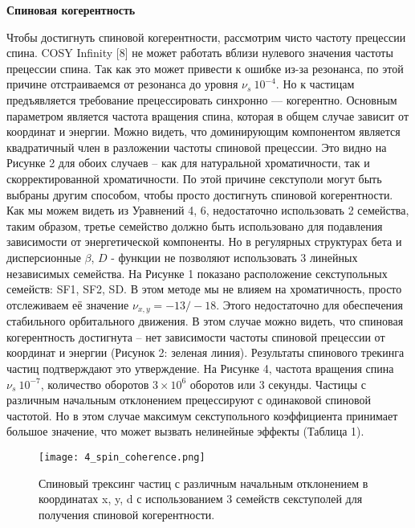 \textbf{Спиновая когерентность}
\par Чтобы достигнуть спиновой когерентности, рассмотрим чисто частоту прецессии спина. COSY Infinity [8] не может работать вблизи нулевого значения частоты прецессии спина. Так как это может привести к ошибке из-за резонанса, по этой причине отстраиваемся от резонанса до уровня $\nu_s~{10}^{-4}$. Но к частицам предъявляется требование прецессировать синхронно — когерентно. 
Основным параметром является частота вращения спина, которая в общем случае зависит от координат и энергии. Можно видеть, что доминирующим компонентом является квадратичный член в разложении частоты спиновой прецессии. Это видно на Рисунке 2 для обоих случаев – как для натуральной хроматичности, так и скорректированной хроматичности. По этой причине секступоли могут быть выбраны другим способом, чтобы просто достигнуть спиновой когерентности.
Как мы можем видеть из Уравнений 4, 6, недостаточно использовать 2 семейства, таким образом, третье семейство должно быть использовано для подавления зависимости от энергетической компоненты. Но в регулярных структурах бета и дисперсионные $\beta$, $D$ - функции не позволяют использовать 3 линейных независимых семейства. На Рисунке 1 показано расположение секступольных семейств: SF1, SF2, SD. В этом методе мы не влияем на хроматичность, просто отслеживаем её значение $\nu_{x,y}=-13/-18$. Этого недостаточно для обеспечения стабильного орбитального движения. В этом случае можно видеть, что спиновая когерентность достигнута – нет зависимости частоты спиновой прецессии от координат и энергии (Рисунок 2: зеленая линия). Результаты спинового трекинга частиц подтверждают это утверждение. На Рисунке 4, частота вращения спина $\nu_s~{10}^{-7}$, количество оборотов $3\times{10}^6$ оборотов или $3$ секунды. Частицы с различным начальным отклонением прецессируют с одинаковой спиновой частотой. Но в этом случае максимум секступольного коэффициента принимает большое значение, что может вызвать нелинейные эффекты (Таблица 1).

\begin{figure}[!h]
  \centering
   \texttt{[image: 4\_spin\_coherence.png]}
   \caption{Спиновый трексинг частиц с различным начальным отклонением в координатах x, y, d с использованием 3 семейств секступолей для получения спиновой когерентности.}
   \label{fig:4_spin_coherence}
\end{figure}

